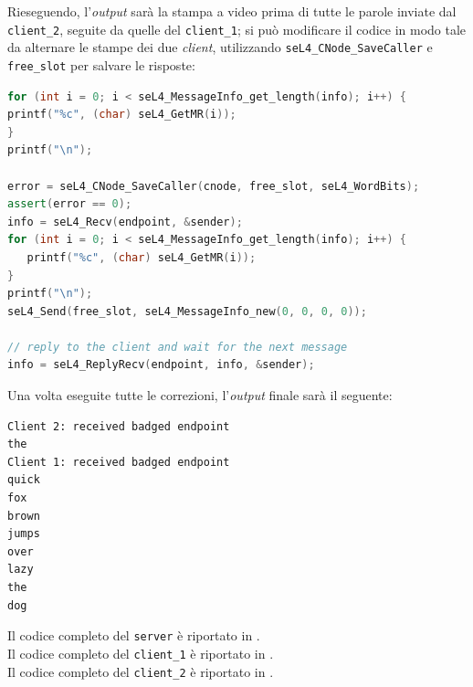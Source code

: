 Rieseguendo, l'\textit{output} sarà la stampa a video prima di tutte le parole inviate dal \texttt{client\_2}, seguite da quelle del \texttt{client\_1}; si può modificare il codice in modo tale da alternare le stampe dei due \textit{client}, utilizzando \texttt{seL4\_CNode\_SaveCaller} e \texttt{free\_slot} per salvare le risposte:
\begin{lstlisting}[language=C++]
for (int i = 0; i < seL4_MessageInfo_get_length(info); i++) {
printf("%c", (char) seL4_GetMR(i));
}
printf("\n");

error = seL4_CNode_SaveCaller(cnode, free_slot, seL4_WordBits);
assert(error == 0);
info = seL4_Recv(endpoint, &sender);
for (int i = 0; i < seL4_MessageInfo_get_length(info); i++) {
   printf("%c", (char) seL4_GetMR(i));
}
printf("\n");
seL4_Send(free_slot, seL4_MessageInfo_new(0, 0, 0, 0));

// reply to the client and wait for the next message
info = seL4_ReplyRecv(endpoint, info, &sender);
\end{lstlisting}

Una volta eseguite tutte le correzioni, l'\textit{output} finale sarà il seguente:
\begin{lstlisting}[language=bash]
Client 2: received badged endpoint
the
Client 1: received badged endpoint
quick
fox
brown
jumps
over
lazy
the
dog
\end{lstlisting}
Il codice completo del \texttt{server} è riportato in \cite{IPCserver}.\\
Il codice completo del \texttt{client\_1} è riportato in \cite{IPCclient1}.\\
Il codice completo del \texttt{client\_2} è riportato in \cite{IPCclient2}.